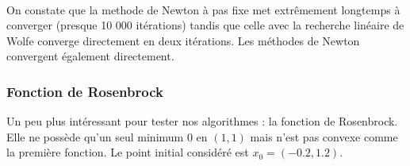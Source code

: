 \documentclass[a4paper,10pt]{article}
\begin{document}
\begin{figure}[H]
	\centering
\end{figure}

\\
\vspace{0.5cm}
On constate que la methode de Newton à pas fixe met extrêmement longtemps à converger (presque 10 000 itérations) tandis que celle avec la recherche linéaire de Wolfe converge directement en deux itérations. Les méthodes de Newton convergent également directement.


\newpage
\subsubsection{Fonction de Rosenbrock}

\vspace{0.5cm}

\hspace{0.4cm}
Un peu plus intéressant pour tester nos algorithmes : la fonction de Rosenbrock.
Elle ne possède qu'un seul minimum 0 en $(1,1)$ mais n'est pas convexe comme la première fonction.
Le point initial considéré est $x_0 = (-0.2,1.2)$.
\end{document}
